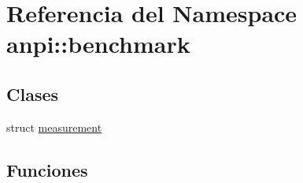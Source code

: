 \hypertarget{namespaceanpi_1_1benchmark}{}\section{Referencia del Namespace anpi\+:\+:benchmark}
\label{namespaceanpi_1_1benchmark}
\subsection*{Clases}
\begin{DoxyCompactItemize}
\item 
struct \hyperlink{structanpi_1_1benchmark_1_1measurement}{measurement}
\end{DoxyCompactItemize}
\subsection*{Funciones}
